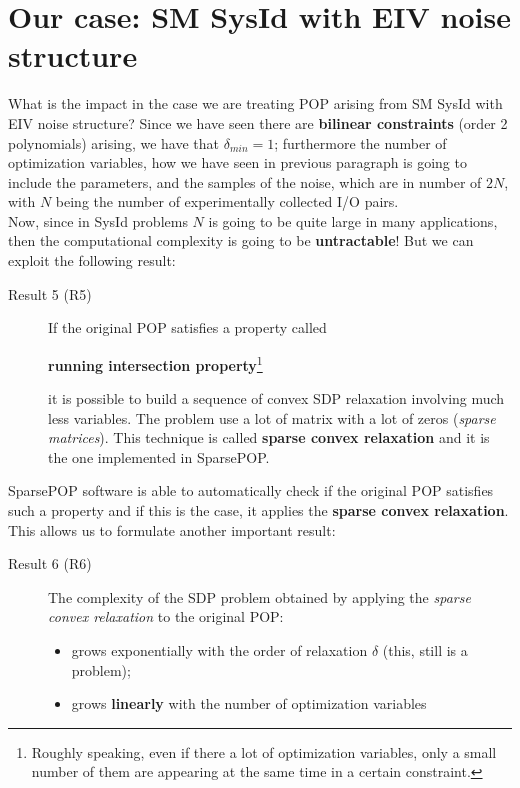 \section{Our case: SM SysId with EIV noise structure}
What is the impact in the case we are treating POP arising from SM SysId with EIV noise structure? Since we have seen there are \textbf{bilinear constraints} (order 2 polynomials) arising, we have that $\delta_{min}=1$; furthermore the number of optimization variables, how we have seen in previous paragraph is going to include the parameters, and the samples of the noise, which are in number of $2N$, with $N$ being the number of experimentally collected I/O pairs.\\
Now, since in SysId problems $N$ is going to be quite large in many applications, then the computational complexity is going to be \textbf{untractable}! But we can exploit the following result:
\begin{description}
    \item[\color{blue}Result 5 \textsf{(R5)}] If the original POP satisfies a property called \begin{center}\textbf{running intersection property}\footnote{
        Roughly speaking, even if there a lot of optimization variables, only a small number of them are appearing at the same time in a certain constraint.
    } \end{center}it is possible to build a sequence of convex SDP relaxation involving much less variables. The problem use a lot of matrix with a lot of zeros (\textit{sparse matrices}). This technique is called \textbf{sparse convex relaxation} and it is the one implemented in SparsePOP.
\end{description}

\noindent
SparsePOP software is able to automatically check if the original POP satisfies such a property and if this is the case, it applies the \textbf{sparse convex relaxation}. This allows us to formulate another important result:

\begin{description}
    \item[\color{blue}Result 6 \textsf{(R6)}] The complexity of the SDP problem obtained by applying the \textit{sparse convex relaxation} to the original POP:
    \vspace{-0.3em}
    \begin{itemize}
        \itemsep-0.3em
        \item grows exponentially with the order of relaxation $\delta$ (this, still is a problem); 
        \item grows \textbf{linearly} with the number of optimization variables
    \end{itemize}
\end{description}

